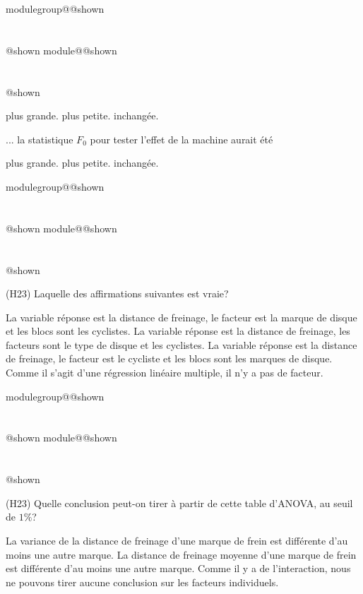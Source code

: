 \documentclass{Evaluation}
\makeatletter
\newcommand{\currentmodulekey}{}
\newcommand{\currentmoduletitle}{}
\newcommand{\currentgroupkey}{}
\newcommand{\currentgrouptitle}{}
\newcommand{\showmoduleifneeded}{%
  \ifx\currentgroupkey\empty\else
    \expandafter\ifx\csname modulegroup@\currentgroupkey @shown\endcsname\relax
      \section*{\currentgrouptitle}%
      \expandafter\gdef\csname modulegroup@\currentgroupkey @shown\endcsname{1}%
    \fi
  \fi
  \expandafter\ifx\csname module@\currentmodulekey @shown\endcsname\relax
    \section*{\currentmoduletitle}%
    \expandafter\gdef\csname module@\currentmodulekey @shown\endcsname{1}%
  \fi
}
\newenvironment{A22}{\showmoduleifneeded}{}
\newenvironment{H23}{\showmoduleifneeded}{}
\makeatother
\begin{document}
\begin{questions}
\begin{A22}
\begin{parts}
\begin{subparts}
\medskip\begin{oneparcheckboxes}
    \CorrectChoice plus grande.
    \choice plus petite.
    \choice inchangée. 
\end{oneparcheckboxes}\medskip

\subpart[1] ... la statistique $F_0$ pour tester l'effet de la machine aurait été

\medskip\begin{oneparcheckboxes}
    \choice plus grande.
    \CorrectChoice plus petite.
    \choice inchangée. 
\end{oneparcheckboxes}\medskip
\end{subparts}

\end{parts}

\end{A22}

\begin{H23}
\question\label{AOVblocs1}
(H23) Laquelle des affirmations suivantes est vraie?

\begin{checkboxes}
    \correctchoice La variable réponse est la distance de freinage, le facteur est la marque de disque et les blocs sont les cyclistes.
\choice La variable réponse est la distance de freinage, les facteurs sont le type de disque et les cyclistes.
\choice La variable réponse est la distance de freinage, le facteur est le cycliste et les blocs sont les marques de disque.
\choice Comme il s'agit d'une régression linéaire multiple, il n'y a pas de facteur.
\end{checkboxes}

\vspace{0.5cm}
\end{H23}

\begin{H23}
\question\label{AOVblocs2}
(H23) Quelle conclusion peut-on tirer à partir de cette table d'ANOVA, au seuil de $1\%$?

\begin{checkboxes}
    \choice La variance de la distance de freinage d'une marque de frein est différente d'au moins une autre marque.
\correctchoice La distance de freinage moyenne d'une marque de frein est différente d'au moins une autre marque.
\choice Comme il y a de l'interaction, nous ne pouvons tirer aucune conclusion sur les facteurs individuels.
\end{checkboxes}
\end{H23}


\end{questions}
\end{document}
